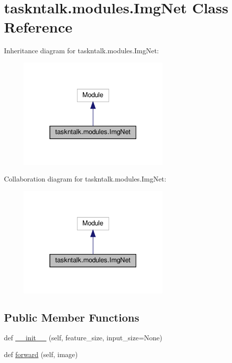 \hypertarget{classtaskntalk_1_1modules_1_1ImgNet}{}\section{taskntalk.\+modules.\+Img\+Net Class Reference}
\label{classtaskntalk_1_1modules_1_1ImgNet}


Inheritance diagram for taskntalk.\+modules.\+Img\+Net\+:
\nopagebreak
\begin{figure}[H]
\begin{center}
\leavevmode
\includegraphics[width=211pt]{classtaskntalk_1_1modules_1_1ImgNet__inherit__graph}
\end{center}
\end{figure}


Collaboration diagram for taskntalk.\+modules.\+Img\+Net\+:
\nopagebreak
\begin{figure}[H]
\begin{center}
\leavevmode
\includegraphics[width=211pt]{classtaskntalk_1_1modules_1_1ImgNet__coll__graph}
\end{center}
\end{figure}
\subsection*{Public Member Functions}
\begin{DoxyCompactItemize}
\item 
def \hyperlink{classtaskntalk_1_1modules_1_1ImgNet_a386437633b44ce30146aa46a7c992b30}{\+\_\+\+\_\+init\+\_\+\+\_\+} (self, feature\+\_\+size, input\+\_\+size=None)
\item 
def \hyperlink{classtaskntalk_1_1modules_1_1ImgNet_a209986185b80feb69f38b57e746f743e}{forward} (self, image)
\end{DoxyCompactItemize}
